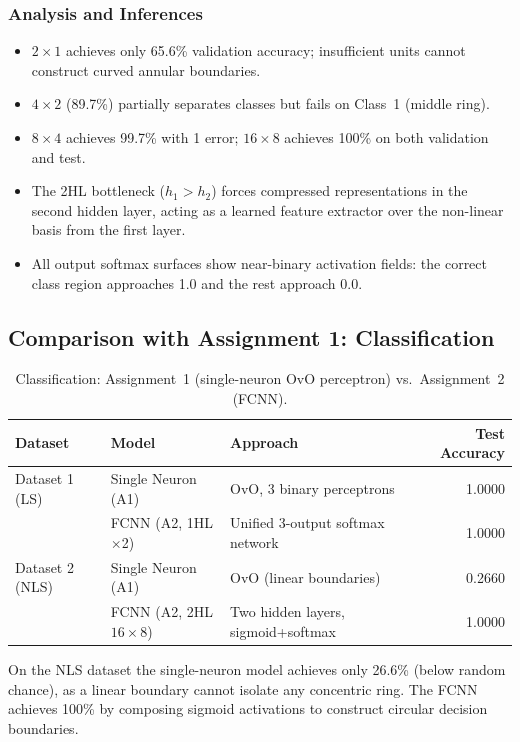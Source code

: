 \documentclass[11pt,a4paper]{article}
\begin{document}
\subsubsection*{Analysis and Inferences}
\begin{itemize}
    \item $2\times1$ achieves only 65.6\% validation accuracy; insufficient units cannot construct curved annular boundaries.
    \item $4\times2$ (89.7\%) partially separates classes but fails on Class~1 (middle ring).
    \item $8\times4$ achieves 99.7\% with 1 error; $16\times8$ achieves 100\% on both validation and test.
    \item The 2HL bottleneck ($h_1>h_2$) forces compressed representations in the second hidden layer, acting as a learned feature extractor over the non-linear basis from the first layer.
    \item All output softmax surfaces show near-binary activation fields: the correct class region approaches 1.0 and the rest approach 0.0.
\end{itemize}

\subsection{Comparison with Assignment 1: Classification}

\begin{table}[H]
\centering
\caption{Classification: Assignment~1 (single-neuron OvO perceptron) vs.\ Assignment~2 (FCNN).}
\begin{tabular}{lllr}
\toprule
Dataset & Model & Approach & Test Accuracy \\
\midrule
Dataset 1 (LS)  & Single Neuron (A1) & OvO, 3 binary perceptrons & 1.0000 \\
                & FCNN (A2, 1HL$\times$2) & Unified 3-output softmax network & 1.0000 \\
\midrule
Dataset 2 (NLS) & Single Neuron (A1) & OvO (linear boundaries) & 0.2660 \\
                & FCNN (A2, 2HL $16\times8$) & Two hidden layers, sigmoid+softmax & 1.0000 \\
\bottomrule
\end{tabular}
\end{table}

On the NLS dataset the single-neuron model achieves only 26.6\% (below random chance), as a linear boundary cannot isolate any concentric ring. The FCNN achieves 100\% by composing sigmoid activations to construct circular decision boundaries.
\end{document}
